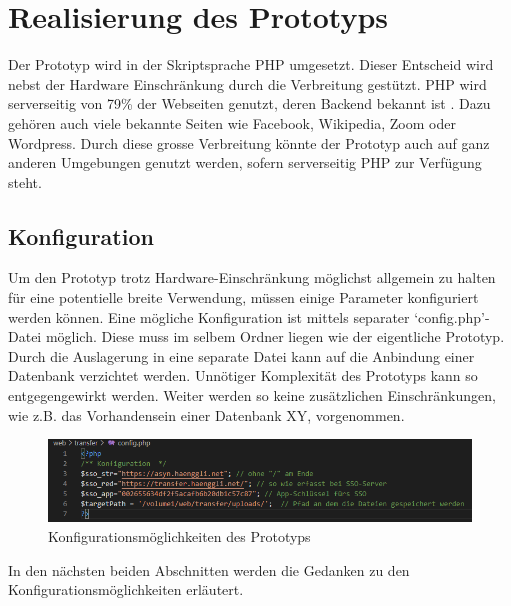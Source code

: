 \chapter{Realisierung des Prototyps}
Der Prototyp wird in der Skriptsprache PHP umgesetzt. 
Dieser Entscheid wird nebst der Hardware Einschränkung durch die Verbreitung gestützt.
PHP wird serverseitig von 79\% der Webseiten genutzt, deren Backend bekannt ist \cite[gemäss Stand Juni 2020]{w3techs}. 
Dazu gehören auch viele bekannte Seiten wie Facebook, Wikipedia, Zoom oder Wordpress.
Durch diese grosse Verbreitung könnte der Prototyp auch auf ganz anderen Umgebungen genutzt werden, sofern serverseitig PHP zur Verfügung steht.

\section{Konfiguration}
Um den Prototyp trotz Hardware-Einschränkung möglichst allgemein zu halten für eine potentielle breite Verwendung, 
müssen einige Parameter konfiguriert werden können. Eine mögliche Konfiguration ist mittels separater `config.php'-Datei möglich.
Diese muss im selbem Ordner liegen wie der eigentliche Prototyp. 
Durch die Auslagerung in eine separate Datei kann auf die Anbindung einer Datenbank verzichtet werden. 
Unnötiger Komplexität des Prototyps kann so entgegengewirkt werden. 
Weiter werden so keine zusätzlichen Einschränkungen, wie z.B. das Vorhandensein einer Datenbank XY, vorgenommen.

\begin{figure}[h]
    \centering
    \includegraphics[width=1\linewidth]{content/images/prototyp_konfiguration.png}
    \caption{Konfigurationsmöglichkeiten des Prototyps}
    \label{fig:Konfigurationsmoeglichkeiten_prototyp}
\end{figure}
In den nächsten beiden Abschnitten werden die Gedanken zu den Konfigurationsmöglichkeiten erläutert.

